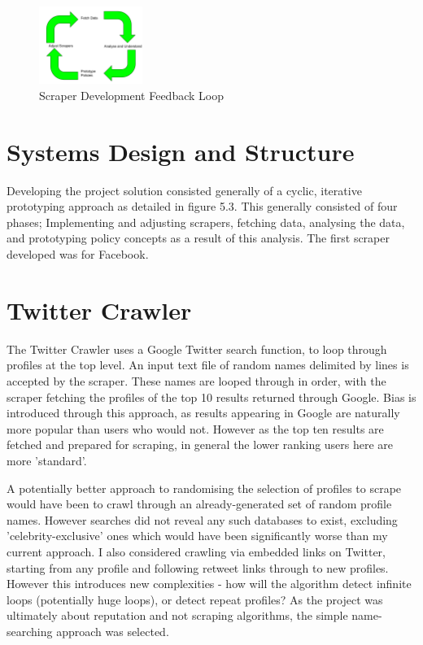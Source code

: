 \begin{figure}[h!]
\centering
\includegraphics[width=0.3\textwidth]{Images/Implementation_Lifecycle.pdf}
\caption{Scraper Development Feedback Loop}
\end{figure}

\section{Systems Design and Structure}

Developing the project solution consisted generally of a cyclic, iterative prototyping approach as detailed in figure 5.3. This generally consisted of four phases; Implementing and adjusting scrapers, fetching data, analysing the data, and prototyping policy concepts as a result of this analysis. The first scraper developed was for Facebook. 

\section{Twitter Crawler}

The Twitter Crawler uses a Google Twitter search function, to loop through profiles at the top level. An input text file of random names delimited by lines is accepted by the scraper. These names are looped through in order, with the scraper fetching the profiles of the top 10 results returned through Google. Bias is introduced through this approach, as results appearing in Google are naturally more popular than users who would not. However as the top ten results are fetched and prepared for scraping, in general the lower ranking users here are more 'standard'. 

A potentially better approach to randomising the selection of profiles to scrape would have been to crawl through an already-generated set of random profile names. However searches did not reveal any such databases to exist, excluding 'celebrity-exclusive' ones which would have been significantly worse than my current approach. I also considered crawling via embedded links on Twitter, starting from any profile and following retweet links through to new profiles. However this introduces new complexities - how will the algorithm detect infinite loops (potentially huge loops), or detect repeat profiles? As the project was ultimately about reputation and not scraping algorithms, the simple name-searching approach was selected. 

